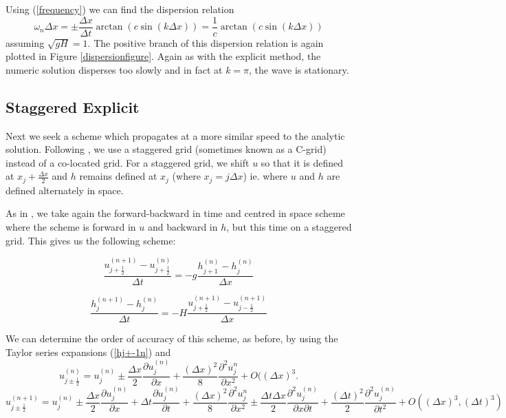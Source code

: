 \documentclass[a4paper,12pt, notitlepage]{article}
\begin{document}
Using (\ref{frequency}) we can find the dispersion relation
\begin{equation}
\omega_{n} \Delta x = \pm\frac{\Delta x}{\Delta t} \arctan(c\sin(k\Delta x)) = \frac{1}{c}  \arctan(c\sin(k\Delta x))
\end{equation}
assuming $\sqrt{gH} = 1$. The positive branch of this dispersion relation is again plotted in Figure \ref{dispersionfigure}. Again as with the explicit method, the numeric solution disperses too slowly and in fact at $k = \pi$, the wave is stationary. 

\subsection{Staggered Explicit}
Next we seek a scheme which propagates at a more similar speed to the analytic solution. Following \cite{MPE textbook}, we use a staggered grid (sometimes known as a C-grid) instead of a co-located grid. For a staggered grid, we shift $u$ so that it is defined at $x_{j} + \frac{\Delta x}{2}$ and $h$ remains defined at $x_{j}$ (where $x_{j} = j \Delta x$) ie. where $u$ and $h$ are defined alternately in space.

As in \cite{MPE textbook}, we take again the forward-backward in time and centred in space scheme where the scheme is forward in $u$ and backward in $h$, but this time on a staggered grid. This gives us the following scheme:

\begin{equation}\label{FTCSCgrid}
\frac{u_{j+ \frac{1}{2}}^{(n+1)} - u_{j + \frac{1}{2}}^{(n)}}{\Delta t} = -g \frac{h_{j+1}^{(n)} - h_{j}^{(n)}}{\Delta x}
\end{equation}

\begin{equation}\label{BTCSCgrid}
\frac{h_{j}^{(n+1)} - h_{j}^{(n)}}{\Delta t} = -H \frac{u_{j+\frac{1}{2}}^{(n+1)} - u_{j-\frac{1}{2}}^{(n+1)}}{\Delta x}
\end{equation}


We can determine the order of accuracy of this scheme, as before, by using the Taylor series expansions (\ref{hj+-1n}) and 
\begin{equation} \label{uj+1/2n}
u_{j \pm \frac{1}{2}}^{(n)} = u_{j}^{(n)} \pm \frac{\Delta x}{2}\frac{\partial u_{j}^{(n)}}{\partial x} + \frac{(\Delta x)^{2}}{8}\frac{\partial^{2}u_{j}^{n}}{\partial x^{2}} + O({(\Delta x)^{3}}.
\end{equation}
\begin{equation} \label{uj+1/2n+1}
u_{j \pm \frac{1}{2}}^{(n + 1)} = u_{j}^{(n)} \pm \frac{\Delta x}{2}\frac{\partial u_{j}^{(n)}}{\partial x} + \Delta t \frac{\partial u_{j}^{(n)}}{\partial t} + \frac{(\Delta x)^{2}}{8}\frac{\partial^{2}u_{j}^{n}}{\partial x^{2}} \pm \frac{\Delta t \Delta x}{2}\frac{\partial^{2} u_{j}^{(n)}}{\partial x \partial t} + \frac{(\Delta t)^{2}}{2} \frac{\partial ^{2} u_{j}^{(n)}}{\partial t ^{2}} + O((\Delta x)^{3}, (\Delta t)^{3})
\end{equation}
\end{document}
